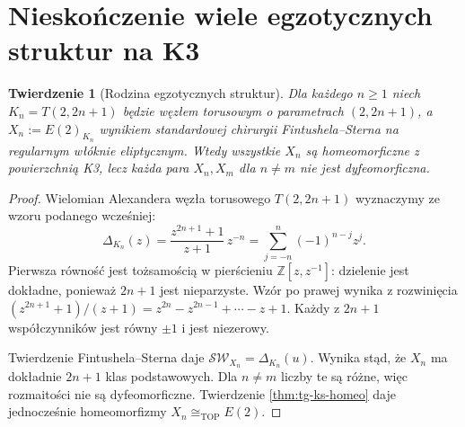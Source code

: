 \documentclass[11pt,a4paper]{report}
\numberwithin{equation}{section}
\theoremstyle{plain}
\newtheorem{twierdzenie}{Twierdzenie}[section]
\theoremstyle{definition}
\theoremstyle{remark}
\begin{document}
\begin{center}
\end{center}

\section{Nieskończenie wiele egzotycznych struktur na K3}
\label{sec:tg-ks-infinite}

\begin{twierdzenie}[Rodzina egzotycznych struktur]
\label{thm:tg-ks-infinite}
Dla każdego $n\ge1$ niech $K_n=T(2,2n+1)$ będzie
węzłem torusowym o parametrach $(2,2n+1)$,
a $X_n:=E(2)_{K_n}$ wynikiem standardowej chirurgii
Fintushela--Sterna na regularnym włóknie eliptycznym.
Wtedy wszystkie $X_n$ są homeomorficzne z powierzchnią
K3, lecz każda para $X_n,X_m$ dla $n\ne m$
nie jest dyfeomorficzna.
\end{twierdzenie}

\begin{proof}
Wielomian Alexandera węzła torusowego
$T(2,2n+1)$ wyznaczymy ze wzoru podanego wcześniej:
\[
\Delta_{K_n}(z)
 =\frac{z^{2n+1}+1}{z+1}\,z^{-n}
 =\sum_{j=-n}^{n}(-1)^{n-j}z^j.
\]
Pierwsza równość jest tożsamością w pierścieniu
$\mathbb Z[z,z^{-1}]$: dzielenie jest dokładne,
ponieważ $2n+1$ jest nieparzyste. Wzór po prawej
wynika z rozwinięcia
$(z^{2n+1}+1)/(z+1)
=z^{2n}-z^{2n-1}+\cdots-z+1$.
Każdy z $2n+1$ współczynników jest równy $\pm1$
i jest niezerowy.

Twierdzenie Fintushela--Sterna daje
$\mathcal{SW}_{X_n}=\Delta_{K_n}(u)$.
Wynika stąd, że $X_n$ ma dokładnie $2n+1$
klas podstawowych. Dla $n\ne m$ liczby te są różne,
więc rozmaitości nie są dyfeomorficzne.
Twierdzenie \ref{thm:tg-ks-homeo} daje jednocześnie
homeomorfizmy $X_n\cong_{\mathrm{TOP}}E(2)$.
\end{proof}
\end{document}
